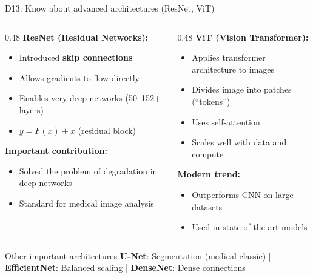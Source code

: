 \documentclass[aspectratio=169, 10pt]{beamer}
\begin{document}
\begin{frame}{D13: Know about advanced architectures (ResNet, ViT)}
    \begin{columns}[T]
        \begin{column}{0.48\textwidth}
            \textbf{ResNet (Residual Networks):}
            \begin{itemize}
                \item Introduced \textbf{skip connections}
                \item Allows gradients to flow directly
                \item Enables very deep networks (50--152+ layers)
                \item $y = F(x) + x$ (residual block)
            \end{itemize}
            
            \vspace{0.2cm}
            \textbf{Important contribution:}
            \begin{itemize}
                \item Solved the problem of degradation in deep networks
                \item Standard for medical image analysis
            \end{itemize}
        \end{column}
        \begin{column}{0.48\textwidth}
            \textbf{ViT (Vision Transformer):}
            \begin{itemize}
                \item Applies transformer architecture to images
                \item Divides image into patches (``tokens'')
                \item Uses self-attention
                \item Scales well with data and compute
            \end{itemize}
            
            \vspace{0.2cm}
            \textbf{Modern trend:}
            \begin{itemize}
                \item Outperforms CNN on large datasets
                \item Used in state-of-the-art models
            \end{itemize}
        \end{column}
    \end{columns}
    
    \vspace{0.3cm}
    \begin{block}{Other important architectures}
        \textbf{U-Net}: Segmentation (medical classic) | \textbf{EfficientNet}: Balanced scaling | \textbf{DenseNet}: Dense connections
    \end{block}
\end{frame}
\end{document}
